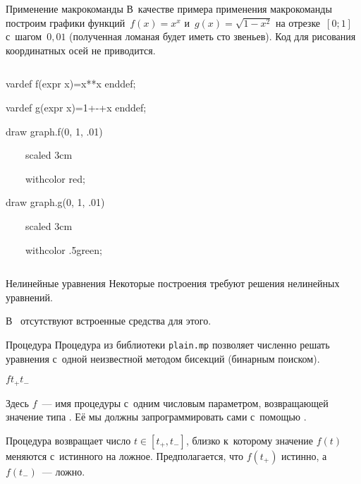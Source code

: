 \begin{frame}{Применение макрокоманды }
В~качестве примера применения макрокоманды  построим графики
функций $f(x)=x^x$ и~$g(x)=\sqrt{1-x^2}$ на отрезке $[0;1]$ с~шагом $0{,}01$
(полученная ломаная будет иметь сто звеньев). Код для рисования координатных
осей не приводится.

\begin{columns}
\centerline{}
\begin{programlisting}
vardef f(expr x)=x**x enddef;\par
vardef g(expr x)=1+-+x enddef;\par
\leavevmode\par
draw graph.f(0, 1, .01)\par
~~~~scaled 3cm\par
~~~~withcolor red;\par
draw graph.g(0, 1, .01)\par
~~~~scaled 3cm\par
~~~~withcolor .5green;
\end{programlisting}
\end{columns}
\end{frame}

\begin{frame}{Нелинейные уравнения}
Некоторые построения требуют решения нелинейных уравнений.

В~ отсутствуют встроенные средства для этого.
\end{frame}

\begin{frame}{Процедура }
Процедура  из библиотеки \nolinkurl{plain.mp} позволяет численно
решать уравнения с~одной неизвестной методом бисекций (бинарным поиском).

\begin{center}
\LARGE
{}$f$\literal{(}$t_+$\literal{,}$t_-$\literal{)}
\end{center}

Здесь $f$~— имя процедуры с~одним числовым параметром, возвращающей значение
типа . Её мы должны запрограммировать сами с~помощью
.

Процедура  возвращает число $t\in[t_+,t_-]$, близко к~которому
значение $f(t)$ меняются с~истинного на ложное. Предполагается, что $f(t_+)$
истинно, а~$f(t_-)$~— ложно.
\end{frame}


